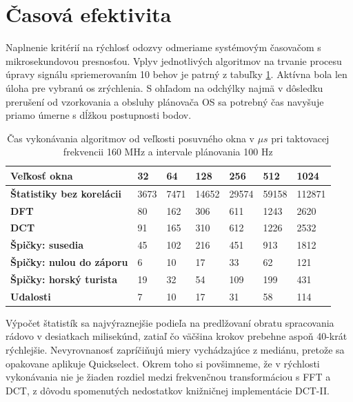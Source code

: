 \section{Časová efektivita}
Naplnenie kritérií na rýchlosť odozvy odmeriame systémovým časovačom s mikrosekundovou presnosťou.
Vplyv jednotlivých algoritmov na trvanie procesu úpravy signálu spriemerovaním 10 behov
je patrný z tabuľky \ref{tab:algorithm-execution}. Aktívna bola len úloha pre vybranú os zrýchlenia. S ohľadom na odchýlky
najmä v dôsledku prerušení od vzorkovania a obsluhy plánovača OS sa potrebný čas navyšuje priamo úmerne
s dĺžkou postupnosti bodov.
\begin{table}[h]
\def\arraystretch{1.25}
\centering
\begin{tabular}{|l|l|l|l|l|l|l|}
\hline
\textbf{Veľkosť okna}         & \textbf{32} & \textbf{64} & \textbf{128} & \textbf{256} & \textbf{512} & \textbf{1024} \\ \hline
\textbf{Štatistiky bez korelácii}& 3673        & 7471        & 14652        & 29574        & 59158        & 112871        \\ \hline
\textbf{DFT}                     & 80          & 162         & 306          & 611          & 1243         & 2620          \\ \hline
\textbf{DCT}                     & 91          & 165         & 310          & 612          & 1226         & 2532          \\ \hline
\textbf{Špičky: susedia}         & 45          & 102         & 216          & 451          & 913          & 1812          \\ \hline
\textbf{Špičky: nulou do záporu} & 6           & 10          & 17           & 33           & 62           & 121           \\ \hline
\textbf{Špičky: horský turista}  & 19          & 32          & 54           & 109          & 199          & 431           \\ \hline
\textbf{Udalosti}                & 7           & 10          & 17           & 31           & 58           & 114           \\ \hline
\end{tabular}
\caption{Čas vykonávania algoritmov od veľkosti posuvného okna v $\mu s$ pri taktovacej frekvencii 160 MHz a intervale
plánovania 100 Hz}
\label{tab:algorithm-execution}
\end{table}

Výpočet štatistík sa najvýraznejšie podieľa na predlžovaní obratu spracovania rádovo v desiatkach
milisekúnd, zatiaľ čo väčšina krokov prebehne aspoň 40-krát rýchlejšie. Nevyrovnanosť zapríčiňujú miery vychádzajúce z
mediánu, pretože sa opakovane aplikuje Quickselect. Okrem toho si povšimneme, že v rýchlosti vykonávania nie je
žiaden rozdiel medzi frekvenčnou transformáciou s FFT a DCT, z dôvodu spomenutých nedostatkov knižničnej implementácie DCT-II.

